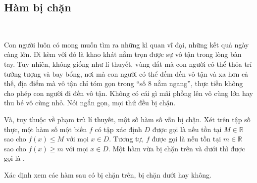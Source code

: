 \subsection{Hàm bị chặn}

\ %

Con người luôn có mong muốn tìm ra những kì quan vĩ đại, những kết quả ngày càng lớn. Đi kèm với đó là khao khát nắm trọn được sự vô tận trong lòng bàn tay. Tuy nhiên, không giống như lí thuyết, vùng đất mà con người có thể thỏa trí tưởng tượng và bay bổng, nơi mà con người có thể đếm đến vô tận và xa hơn cả thế, địa điểm mà vô tận chỉ tóm gọn trong ``số $8$ nằm ngang'', thực tiễn không cho phép con người đi đến vô tận. Không có cái gì mãi phồng lên vô cùng lớn hay thu bé vô cùng nhỏ. Nói ngắn gọn, mọi thứ đều bị chặn.

Và, tuy thuộc về phạm trù lí thuyết, một số hàm số vẫn bị chặn. Xét trên tập số thực, một hàm số một biến $f$ có tập xác định $D$ được gọi là  nếu tồn tại $M \in \mathbb{R}$ sao cho $f(x) \leq M$ với mọi $x \in D$. Tương tự, $f$ được gọi là  nếu tồn tại $m \in \mathbb{R}$ sao cho $f(x) \geq m$ với mọi $x \in D$. Một hàm vừa bị chặn trên và dưới thì được gọi là .

\exercise Xác định xem các hàm sau có bị chặn trên, bị chặn dưới hay không.

\begin{multicols}{2}
\end{multicols}

